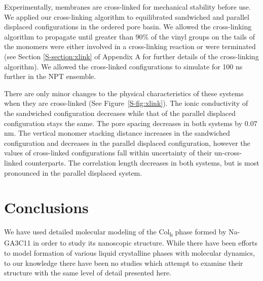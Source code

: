   Experimentally, membranes are cross-linked for mechanical stability before
  use. We applied our cross-linking algorithm to equilibrated sandwiched and
  parallel displaced configurations in the ordered pore basin. We allowed the
  cross-linking algorithm to propagate until greater than 90\% of the vinyl
  groups on the tails of the monomers were either involved in a cross-linking
  reaction or were terminated (see Section \ref{S-section:xlink} of Appendix A for
  further details of the cross-linking algorithm). We allowed the cross-linked
  configurations to simulate for 100 ns further in the NPT ensemble. 

  There are only minor changes to the physical characteristics of these systems when 
  they are cross-linked (See Figure~\ref{S-fig:xlink}). The ionic conductivity of 
  the sandwiched configuration decreases while that of the parallel displaced 
  configuration stays the same. The pore spacing decreases in both systems by
  0.07 nm. The vertical monomer stacking distance increases in the sandwiched
  configuration and decreases in the parallel displaced configuration, however the 
  values of cross-linked configurations fall within uncertainty of their un-cross-linked
  counterparts. The correlation length decreases in both systems, 
  but is most pronounced in the parallel displaced system.  
  
 
  \section{Conclusions}
   
  We have used detailed molecular modeling of the Col\textsubscript{h} phase
  formed by Na-GA3C11 in order to study its nanoscopic structure. While there
  have been efforts to model formation of various liquid crystalline phases with
  molecular dynamics, to our knowledge there have been no studies which attempt
  to examine their structure with the same level of detail presented here.
  

